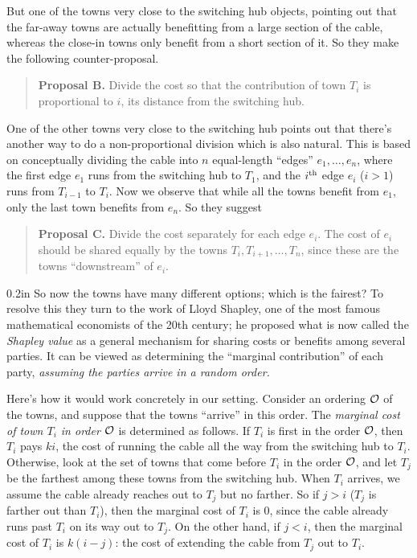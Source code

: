 \documentclass[12pt]{article}
\def\gap{0.2in}
\begin{document}
\begin{enumerate}
But one of the towns very close to the switching hub objects,
pointing out that the far-away towns are actually
benefitting from a large section of the cable,
whereas the close-in towns only benefit from a short section of it.
So they make the following counter-proposal.
\begin{quote}
{\bf Proposal B.} Divide the cost so that the contribution
of town $T_i$ is proportional to $i$, its distance
from the switching hub.
\end{quote}

One of the other towns very close to the switching hub
points out that there's another way to do
a non-proportional division which is also natural.
This is based on conceptually dividing the
cable into $n$ equal-length ``edges'' $e_1, \ldots, e_n$,
where the first edge $e_1$ runs from the switching hub to $T_1$,
and the $i^{\rm th}$ edge $e_i$ ($i > 1$) runs from
$T_{i-1}$ to $T_i$.
Now we observe that while all the towns benefit from
$e_1$, only the last town benefits from $e_n$.
So they suggest
\begin{quote}
{\bf Proposal C.} Divide the cost separately for each edge $e_i$.
The cost of $e_i$ should be shared equally by the towns
$T_i, T_{i+1}, \ldots, T_n$, since these are the towns
``downstream'' of $e_i$.
\end{quote}

\gap
So now the towns have many different options; which is the fairest?
To resolve this they turn to the work of Lloyd Shapley,
one of the most famous mathematical economists of the 20th century;
he proposed what is now called the {\em Shapley value}
as a general mechanism for sharing costs or benefits among several parties.
It can be viewed as determining the ``marginal contribution''
of each party, {\em assuming the parties arrive in a random order.}

Here's how it would work concretely in our setting.
Consider an ordering $\cal O$ of the towns,
and suppose that the towns ``arrive'' in this order.
The {\em marginal cost of town $T_i$ in order $\cal O$}
is determined as follows.
If $T_i$ is first in the order $\cal O$, then $T_i$ pays
$ki$, the cost of running the cable all the way from
the switching hub to $T_i$.
Otherwise, look at the set of
towns that come before $T_i$ in the order $\cal O$,
and let $T_j$ be the farthest among these towns from the
switching hub.
When $T_i$ arrives, we assume the cable already
reaches out to $T_j$ but no farther.
So if $j > i$ ($T_j$ is farther out than $T_i$),
then the marginal cost of $T_i$ is $0$, since
the cable already runs past $T_i$ on its way out to $T_j$.
On the other hand, if $j < i$, then the marginal cost of $T_i$
is $k(i-j)$: the cost of extending the cable from
$T_j$ out to $T_i$.


\end{enumerate}
\end{document}
